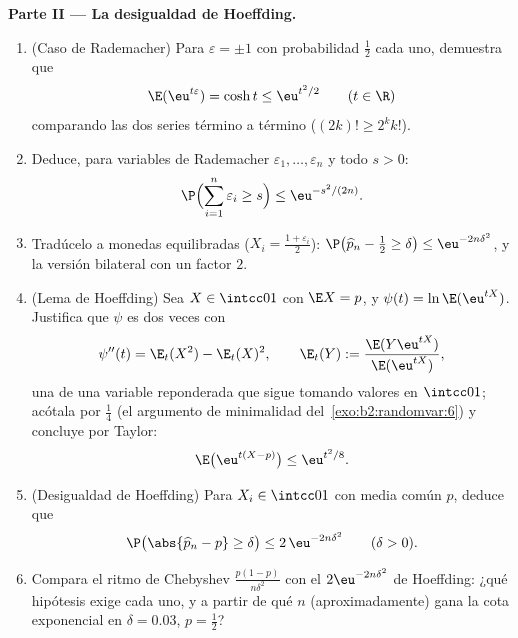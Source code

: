 \begin{problem}
\medskip
\noindent\textbf{Parte II --- La desigualdad de Hoeffding.}
\begin{enumerate}[resume]
  \item (Caso de Rademacher) Para $\varepsilon = \pm1$ con
        probabilidad $\frac12$ cada uno, demuestra que
        \[
        \E(\eu^{t\varepsilon}) = \cosh t \leq \eu^{t^2/2}
        \qquad (t \in \R)
        \]
        comparando las dos series término a término ($(2k)! \geq
        2^kk!$).
  \item Deduce, para variables de Rademacher 
        $\varepsilon_1, \dots, \varepsilon_n$ y todo $s > 0$:
        \[
        \P\Bigl(\sum_{i=1}^n\varepsilon_i \geq s\Bigr)
        \leq \eu^{-s^2/(2n)} .
        \]
  \item Tradúcelo a monedas equilibradas ($X_i =
        \frac{1+\varepsilon_i}2$): $\P\bigl(\widehat p_n - \tfrac12
        \geq \delta\bigr) \leq \eu^{-2n\delta^2}$, y la versión
        bilateral con un factor $2$.
  \item (Lema de Hoeffding) Sea $X \in \intcc01$ con $\E X = p$, y
        $\psi(t) = \ln\E(\eu^{tX})$. Justifica que $\psi$ es dos
        veces  con
        \[
        \psi''(t) = \E_t(X^2) - \E_t(X)^2, \qquad
        \E_t(Y) := \frac{\E(Y\eu^{tX})}{\E(\eu^{tX})},
        \]
        una \emph{} de una variable reponderada que sigue
        tomando valores en $\intcc01$; acótala por $\frac14$ (el
        argumento de minimalidad del~\cref{exo:b2:randomvar:6}) y
        concluye por Taylor:
        \[
        \E\bigl(\eu^{t(X - p)}\bigr) \leq \eu^{t^2/8} .
        \]
  \item (Desigualdad de Hoeffding) Para $X_i \in \intcc01$
         con media común $p$, deduce que
        \[
        \P\bigl(\abs{\widehat p_n - p} \geq \delta\bigr)
        \leq 2\,\eu^{-2n\delta^2}
        \qquad (\delta > 0).
        \]
  \item Compara el ritmo de Chebyshev $\frac{p(1-p)}{n\delta^2}$ con
        el $2\eu^{-2n\delta^2}$ de Hoeffding: ¿qué hipótesis exige
        cada uno, y a partir de qué $n$ (aproximadamente) gana la
        cota exponencial en $\delta = 0.03$, $p = \frac12$?
\end{enumerate}


\end{problem}
